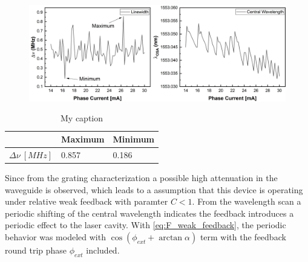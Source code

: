 \begin{figure}[ht]
    \centering
    \includegraphics[width=\linewidth]{figures/linewidth_and_spectra_5742.png}
    \caption{}
    \label{fig:linewidth_and_spectra_5742}
\end{figure}

\begin{table}[ht]
    \centering
    \caption{My caption}
    \label{my-label}
    \begin{tabular}{@{}lll@{}}
    \toprule
                        & Maximum & Minimum \\ \midrule
    $\Delta\nu \ [MHz]$ & 0.857   & 0.186   \\ \bottomrule
    \end{tabular}
\end{table}

Since from the grating characterization a possible high attenuation in the waveguide is observed, which leads to a assumption that this device is operating under relative weak feedback with paramter $C<1$. From the wavelength scan a periodic shifting of the central wavelength indicates the feedback introduces a periodic effect to the laser cavity. With \autoref{eq:F_weak_feedback}, the periodic behavior was modeled with $\cos(\phi_{ext}+\arctan\alpha)$ term with the feedback round trip phase $\phi_{ext}$ included. 



